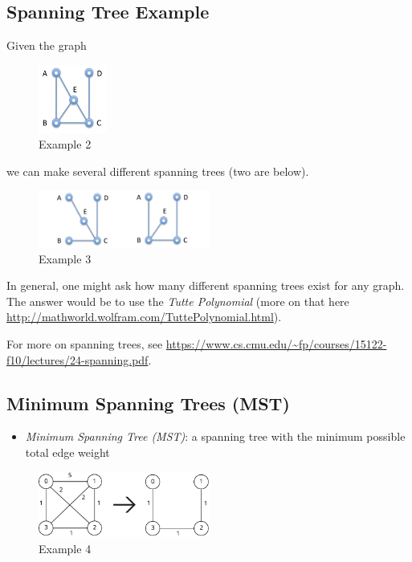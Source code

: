 \documentclass[
  10pt,
  english,
  letterpaper,
,tablecaptionabove
]{scrartcl}
\providecommand{\tightlist}{%
  \setlength{\itemsep}{0pt}\setlength{\parskip}{0pt}}
\begin{document}
\hypertarget{spanning-tree-example}{%
\subsection{Spanning Tree Example}\label{spanning-tree-example}}

Given the graph

\begin{figure}
\centering
\includegraphics[width=0.2\textwidth,height=\textheight]{images/2.png}
\caption{Example 2}
\end{figure}

we can make several different spanning trees (two are below).

\begin{figure}
\centering
\includegraphics[width=0.5\textwidth,height=\textheight]{images/3.png}
\caption{Example 3}
\end{figure}

In general, one might ask how many different spanning trees exist for
any graph. The answer would be to use the \emph{Tutte Polynomial} (more
on that here \url{http://mathworld.wolfram.com/TuttePolynomial.html}).

For more on spanning trees, see
\url{https://www.cs.cmu.edu/~fp/courses/15122-f10/lectures/24-spanning.pdf}.

\hypertarget{minimum-spanning-trees-mst}{%
\subsection{Minimum Spanning Trees
(MST)}\label{minimum-spanning-trees-mst}}

\begin{itemize}
\tightlist
\item
  \emph{Minimum Spanning Tree (MST)}: a spanning tree with the minimum
  possible total edge weight
\end{itemize}

\begin{figure}
\centering
\includegraphics[width=0.5\textwidth,height=\textheight]{images/4.svg}
\caption{Example 4}
\end{figure}
\end{document}
